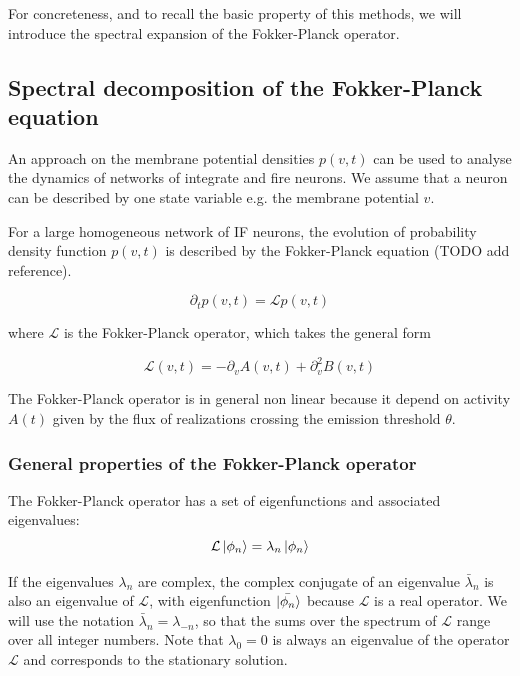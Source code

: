 \documentclass[a4paper,11pt,twoside]{article}
\numberwithin{equation}{section}
\begin{document}
For concreteness, and to recall the basic property of this methods, we will introduce the spectral expansion of the Fokker-Planck operator.


\subsection{Spectral decomposition of the Fokker-Planck equation}
An approach on the membrane potential densities $p(v,t)$ can be used to analyse the dynamics of networks of integrate and fire neurons. We assume that a neuron can be described by one state variable e.g. the membrane potential $v$.

For a large homogeneous network of IF neurons, the evolution of probability density function $p(v,t)$ is described by the Fokker-Planck equation (TODO add reference).  

\begin{equation}
\label{eq:fokkerplanck}
\partial_t p(v,t)=\mathcal{L}p(v,t)
\end{equation}

where $\mathcal{L}$ is the Fokker-Planck operator, which takes the general form

\begin{equation}
\label{eq:Lfokker}
\mathcal{L}(v,t)=-\partial_v A(v,t) +\partial_v^2 B(v,t)
\end{equation}

The Fokker-Planck operator is in general non linear because it depend on activity $A(t)$ given by the flux of realizations crossing the emission threshold $\theta$.


\subsubsection{General properties of the Fokker-Planck operator}
The Fokker-Planck operator has a set of eigenfunctions and associated eigenvalues:
\begin{equation}
\label{eq:fokkerplanckoperator}
\mathcal{L}\ket{\phi_n}=\lambda_n\ket{\phi_n}
\end{equation}

If the eigenvalues $\lambda_n$ are complex, the complex conjugate of an eigenvalue  $\bar{\lambda}_n$  is also an eigenvalue of $\mathcal{L}$, with eigenfunction $\ket{\bar{\phi_n}}$ because $\mathcal{L}$ is a real operator. We will use the notation $\bar{\lambda}_n=\lambda_{-n}$, so that the sums over the spectrum of $\mathcal{L}$ range over all integer numbers. Note that $\lambda_0=0$ is always an eigenvalue of the operator $\mathcal{L}$ and corresponds to the stationary solution.
\end{document}
